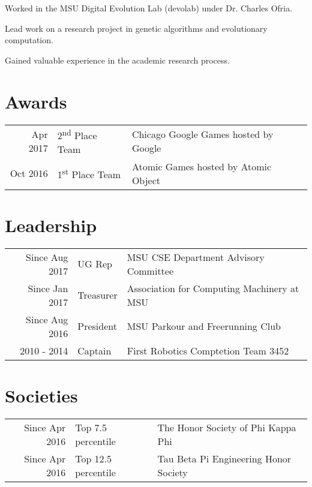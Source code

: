 \documentclass[]{deedy-resume-openfont}
\begin{document}
\begin{minipage}[t]{0.66\textwidth}
\begin{tightemize}
\item Worked in the MSU Digital Evolution Lab (devolab) under Dr. Charles Ofria.
\item Lead work on a research project in genetic algorithms and evolutionary computation.
\item Gained valuable experience in the academic research process.
\end{tightemize}
\sectionsep


\section{Awards}

\begin{tabular}{rll}
Apr 2017 & 2\textsuperscript{nd} Place Team & Chicago Google Games hosted by Google\\
Oct 2016 & 1\textsuperscript{st} Place Team & Atomic Games hosted by Atomic Object\\
\end{tabular}
\sectionsep


\section{Leadership} 

\begin{tabular}{rll}
Since Aug 2017 & UG Rep & MSU CSE Department Advisory Committee\\
Since Jan 2017 & Treasurer & Association for Computing Machinery at MSU\\
Since Aug 2016 & President & MSU Parkour and Freerunning Club\\
2010 - 2014 & Captain & First Robotics Comptetion Team 3452
\end{tabular}
\sectionsep


\section{Societies} 

\begin{tabular}{rll}
Since Apr 2016 & Top 7.5 percentile & The Honor Society of Phi Kappa Phi\\
Since Apr 2016 & Top 12.5 percentile & Tau Beta Pi Engineering Honor Society\\
\end{tabular}
\sectionsep

\end{minipage} 
\end{document}
